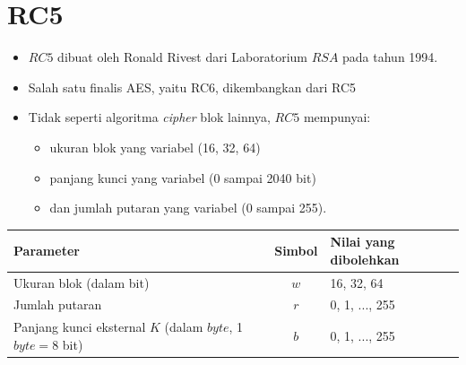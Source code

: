 \documentclass{article}
\begin{document}

\section*{RC5}

\begin{itemize}
    \item $RC5$ dibuat oleh Ronald Rivest dari Laboratorium $RSA$ pada tahun 1994.
    \item Salah satu finalis AES, yaitu RC6, dikembangkan dari RC5
\end{itemize}

\begin{itemize}
    \item Tidak seperti algoritma \textit{cipher} blok lainnya, $RC5$ mempunyai:
    \begin{itemize}
        \item ukuran blok yang variabel (16, 32, 64)
        \item panjang kunci yang variabel (0 sampai 2040 bit)
        \item dan jumlah putaran yang variabel (0 sampai 255).
    \end{itemize}
\end{itemize}

\vspace{5mm}

\begin{tabular}{|l|c|l|}
\hline
\textbf{Parameter} & \textbf{Simbol} & \textbf{Nilai yang dibolehkan} \\ \hline
Ukuran blok (dalam bit) & $w$ & 16, 32, 64 \\ \hline
Jumlah putaran & $r$ & 0, 1, ..., 255 \\ \hline
Panjang kunci eksternal $K$ (dalam $byte$, 1 $byte = 8$ bit) & $b$ & 0, 1, ..., 255 \\ \hline
\end{tabular}
\end{document}
